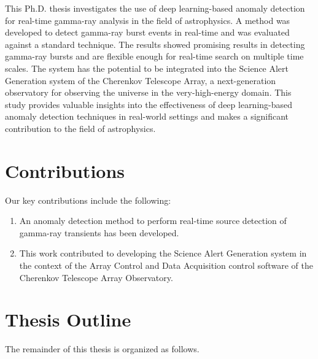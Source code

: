 This Ph.D. thesis investigates the use of deep learning-based anomaly detection for real-time gamma-ray analysis in the field of astrophysics. A method was developed to detect gamma-ray burst events in real-time and was evaluated against a standard technique. The results showed promising results in detecting gamma-ray bursts and are flexible enough for real-time search on multiple time scales. The system has the potential to be integrated into the Science Alert Generation system of the Cherenkov Telescope Array, a next-generation observatory for observing the universe in the very-high-energy domain. This study provides valuable insights into the effectiveness of deep learning-based anomaly detection techniques in real-world settings and makes a significant contribution to the field of astrophysics.


\section{Contributions}
\label{s:Contributions}

Our key contributions include the following:

\begin{enumerate}

  \item An anomaly detection method to perform real-time source detection of gamma-ray transients has been developed.
  
  \item This work contributed to developing the Science Alert Generation system in the context of the Array Control and Data Acquisition control software of the Cherenkov Telescope Array Observatory.

\end{enumerate}

\section{Thesis Outline}
\label{s:Outline}

The remainder of this thesis is organized as follows. 

